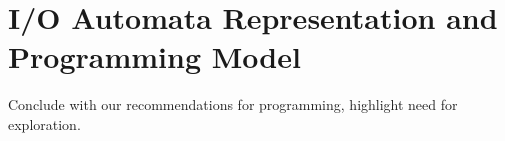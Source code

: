 \section{I/O Automata Representation and Programming Model\label{representation}}

Conclude with our recommendations for programming, highlight need for exploration.
